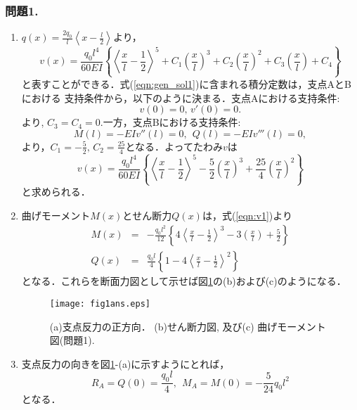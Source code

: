 \documentclass[10pt,a4j]{jarticle}
\begin{document}
\subsubsection*{問題1. }
\begin{enumerate}
\item
$q(x)=\frac{2q_0}{l}\left<x-\frac{l}{2}\right>$より，
\begin{equation}
	v(x)=\frac{q_0l^4}{60EI}\left\{
			\left< \frac{x}{l} -\frac{1}{2} \right>^5
			+
			C_1\left(\frac{x}{l}\right)^3
			+
			C_2\left(\frac{x}{l}\right)^2
			+
			C_3\left(\frac{x}{l}\right)
			+
			C_4
		\right\}
		\label{eqn:gen_sol1}
\end{equation}
と表すことができる．式(\ref{eqn:gen_sol1})に含まれる積分定数は，支点AとBにおける
支持条件から，以下のように決まる．支点Aにおける支持条件:
\begin{equation}
	v(0) =0, \, v'(0)=0.
	\label{eqn:BC1_A}
\end{equation}
より, $C_3=C_4=0$.一方，支点Bにおける支持条件:
\begin{equation}
	M(l)=-EIv''(l) =0,
	\ \  
	Q(l)=-EIv'''(l) =0,
	\label{eqn:BC1_B}
\end{equation}
より，$C_1=-\frac{5}{2},\, C_2=\frac{25}{4}$となる．よってたわみ$v$は
\begin{equation}
	v(x)=\frac{q_0l^4}{60EI}\left\{
			\left< \frac{x}{l} -\frac{1}{2} \right>^5
			-
			\frac{5}{2}	
			\left(\frac{x}{l}\right)^3
			+
			\frac{25}{4}	
			\left(\frac{x}{l}\right)^2
			\right\}
	\label{eqn:v1}
\end{equation}
と求められる．
\item
曲げモーメント$M(x)$とせん断力$Q(x)$は，式(\ref{eqn:v1})より
\begin{eqnarray}
	M(x) &=& 
		-\frac{q_0l^2}{12}\left\{
				4
				\left< \frac{x}{l} -\frac{1}{2} \right>^3
				-
				3
				\left(\frac{x}{l}\right)
				+
				\frac{5}{2}
		\right\}
	\label{eqn:M1}
	\\
	Q(x) &=&
		\frac{q_0l}{4} 
		\left\{
				1-
				4
				\left<\frac{x}{l} -\frac{1}{2}\right>^2
		\right\}
	\label{eqn:Q1}
\end{eqnarray}
となる．これらを断面力図として示せば図\ref{fig:fig1}の(b)および(c)のようになる．
\begin{figure}[h]
	\begin{center}
	\texttt{[image: fig1ans.eps]} 
	\end{center}
	\vspace{-5mm}
	\caption{(a)支点反力の正方向．
	(b)せん断力図, 及び(c) 曲げモーメント図(問題1).}
	\label{fig:fig1}
\end{figure}
\item
支点反力の向きを図\ref{fig:fig1}-(a)に示すようにとれば，
\begin{equation}
	R_A = Q(0) = \frac{q_0l}{4}, \ \ 
	M_A = M(0) = -\frac{5}{24}q_0l^2
\end{equation}
となる．
\end{enumerate}
\end{document}
